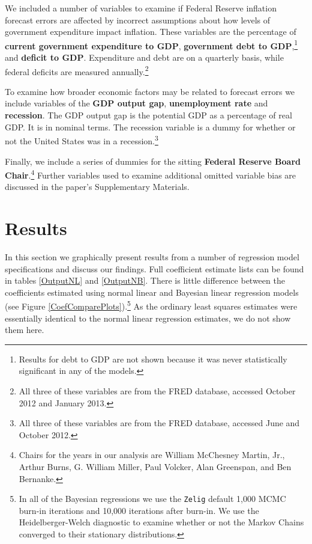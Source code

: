 \documentclass[a4paper]{article}
\begin{document}
We included a number of variables to examine if Federal Reserve inflation forecast errors are affected by incorrect assumptions about how levels of government expenditure impact inflation. These variables are the percentage of {\bf{current government expenditure to GDP}}, {\bf{government debt to GDP}},\footnote{Results for debt to GDP are not shown because it was never statistically significant in any of the models.} and \textbf{deficit to GDP}. Expenditure and debt are on a quarterly basis, while federal deficits are measured annually.\footnote{All three of these variables are from the FRED database, accessed October 2012 and January 2013.}

To examine how broader economic factors may be related to forecast errors we include variables of the {\bf{GDP output gap}}, {\bf{unemployment rate}} and {\bf{recession}}. The GDP output gap is the potential GDP as a percentage of real GDP. It is in nominal terms. The recession variable is a dummy for whether or not the United States was in a recession.\footnote{All three of these variables are from the FRED database, accessed June and October 2012.} 

Finally, we include a series of dummies for the sitting {\bf{Federal Reserve Board Chair}}.\footnote{Chairs for the years in our analysis are William McChesney Martin, Jr., Arthur Burns, G. William Miller, Paul Volcker, Alan Greenspan, and Ben Bernanke.} Further variables used to examine additional omitted variable bias are discussed in the paper's Supplementary Materials.

\section{Results}

In this section we graphically present results from a number of regression model specifications and discuss our findings. Full coefficient estimate lists can be found in tables \ref{OutputNL} and \ref{OutputNB}. There is little difference between the coefficients estimated using normal linear and Bayesian linear regression models (see Figure \ref{CoefComparePlots}).\footnote{In all of the Bayesian regressions we use the {\tt{Zelig}} default 1,000 MCMC burn-in iterations and 10,000 iterations after burn-in. We use the Heidelberger-Welch diagnostic to examine whether or not the Markov Chains converged to their stationary distributions.} As the ordinary least squares estimates were essentially identical to the normal linear regression estimates, we do not show them here.
\end{document}
